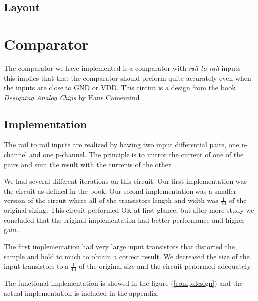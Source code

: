 \documentclass[english, 12pt, a4paper]{ifimaster}
\begin{document}
\subsection{Layout}



\section{Comparator}
The comparator we have implemented is a comparator with \textit{rail to rail} inputs this implies that that the comparator should preform quite accurately even when the inputs are close to 
GND or VDD. This circiut is a design from the book \textit{Designing Analog Chips} by Hans Camenzind \cite{hansc}.



\subsection{Implementation}
The rail to rail inputs are realized by hawing two input differential pairs, one n-channel and one p-channel.
The principle is to mirror the current of one of the pairs and sum the result with the currents of the other.

We had several different iterations on this circuit.
Our first implementation was the circuit as defined in the book.
Our second implementation was a smaller version of the circuit where all of the transistors length and width was \( \frac{1}{10} \) of the original sizing. 
This circuit performed OK at first glance, but after more study we concluded that the original implementation had better performance and higher gain. 

The first implementation had very large input transistors that distorted the sample and hold to much to obtain a correct result.
We decreased the size of the input transistors to a \( \frac{1}{10} \) of the original size and the circuit performed adequately.

The functional implementation is showed in the figure (\ref{comp:design}) and the actual implementation is included in the appendix.
\end{document}
